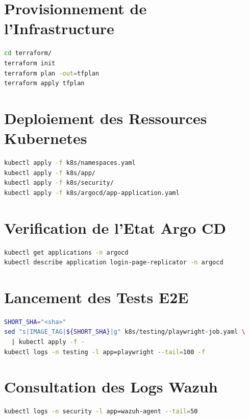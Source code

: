 ﻿%
\section{Provisionnement de l'Infrastructure}
\begin{lstlisting}[language=bash, caption=Provisionnement Terraform]
cd terraform/
terraform init
terraform plan -out=tfplan
terraform apply tfplan
\end{lstlisting}
\section{Deploiement des Ressources Kubernetes}
\begin{lstlisting}[language=bash, caption=Application des manifests Kubernetes]
kubectl apply -f k8s/namespaces.yaml
kubectl apply -f k8s/app/
kubectl apply -f k8s/security/
kubectl apply -f k8s/argocd/app-application.yaml
\end{lstlisting}
\section{Verification de l'Etat Argo CD}
\begin{lstlisting}[language=bash, caption=Verification de la synchronisation Argo CD]
kubectl get applications -n argocd
kubectl describe application login-page-replicator -n argocd
\end{lstlisting}
\section{Lancement des Tests E2E}
\begin{lstlisting}[language=bash, caption=Lancement manuel des tests Playwright]
SHORT_SHA="<sha>"
sed "s|IMAGE_TAG|${SHORT_SHA}|g" k8s/testing/playwright-job.yaml \
  | kubectl apply -f -
kubectl logs -n testing -l app=playwright --tail=100 -f
\end{lstlisting}
\section{Consultation des Logs Wazuh}
\begin{lstlisting}[language=bash, caption=Consultation des logs de l'agent Wazuh]
kubectl logs -n security -l app=wazuh-agent --tail=50
\end{lstlisting}

